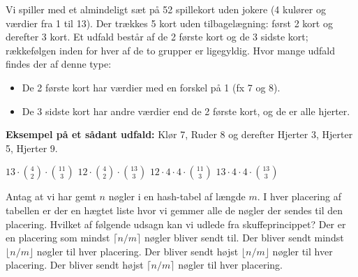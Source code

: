 Vi spiller med et almindeligt sæt på 52 spillekort uden jokere (4 kulører og værdier fra 1 til 13).
Der trækkes 5 kort uden tilbagelægning: først 2 kort og derefter 3 kort.
Et udfald består af de 2 første kort og de 3 sidste kort; rækkefølgen inden for hver af de to grupper er ligegyldig.
Hvor mange udfald findes der af denne type:
\begin{itemize}
\item De 2 første kort har værdier med en forskel på 1 (fx 7 og 8).
\item De 3 sidste kort har andre værdier end de 2 første kort, og de er alle hjerter.
\end{itemize}

\textbf{Eksempel på et sådant udfald:} Klør 7, Ruder 8 og derefter Hjerter 3, Hjerter 5, Hjerter 9.

\etsvar
\mulighederstart
\svar \(13 \cdot \binom{4}{2} \cdot \binom{11}{3}\)
\svar \(12 \cdot \binom{4}{2} \cdot \binom{13}{3}\)
\svar \(12 \cdot 4 \cdot 4 \cdot \binom{11}{3}\)\korrekt
{}
\svar \(13 \cdot 4 \cdot 4 \cdot \binom{13}{3}\)
\mulighederslut



Antag at vi har gemt \(n\) nøgler i en hash-tabel af længde \(m\).
I hver placering af tabellen er der en hægtet liste hvor vi gemmer alle de nøgler der sendes til den placering.
Hvilket af følgende udsagn kan vi udlede fra
skuffeprincippet?
\etsvar
\mulighederstart
\svar Der er en placering som mindst \(\lceil n/m \rceil\) nøgler bliver sendt til. \korrekt
\svar Der bliver sendt mindst \(\lfloor n/m \rfloor\) nøgler til hver placering.
\svar Der bliver sendt højst \(\lfloor n/m \rfloor\) nøgler til hver placering.
\svar Der bliver sendt højst \(\lceil n/m \rceil\) nøgler til hver placering.
\mulighederslut
{}


